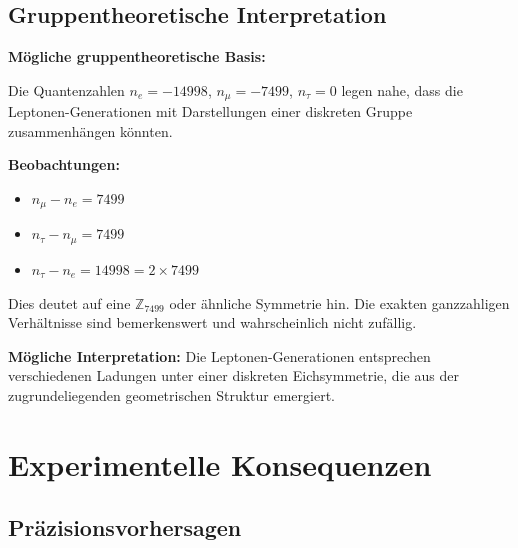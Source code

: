 	\subsection{Gruppentheoretische Interpretation}
	
	\begin{abhandlung}
		\textbf{Mögliche gruppentheoretische Basis:}
		
		Die Quantenzahlen $n_e = -14998$, $n_\mu = -7499$, $n_\tau = 0$ legen nahe, dass die Leptonen-Generationen mit Darstellungen einer diskreten Gruppe zusammenhängen könnten.
		
		\textbf{Beobachtungen:}
		\begin{itemize}
			\item $n_\mu - n_e = 7499$
			\item $n_\tau - n_\mu = 7499$
			\item $n_\tau - n_e = 14998 = 2 \times 7499$
		\end{itemize}
		
		Dies deutet auf eine $\mathbb{Z}_{7499}$ oder ähnliche Symmetrie hin. Die exakten ganzzahligen Verhältnisse sind bemerkenswert und wahrscheinlich nicht zufällig.
		
		\textbf{Mögliche Interpretation:}
		Die Leptonen-Generationen entsprechen verschiedenen Ladungen unter einer diskreten Eichsymmetrie, die aus der zugrundeliegenden geometrischen Struktur emergiert.
	\end{abhandlung}

	\section{Experimentelle Konsequenzen}
	
	\subsection{Präzisionsvorhersagen}
	
